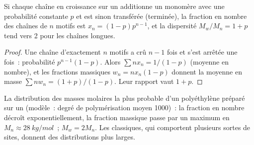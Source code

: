 \begin{proposition}\label{prop:b3:homogeneous-catalysis:schulz-flory}
Si chaque chaîne en croissance sur un  additionne
un monomère avec une probabilité constante $p$ et est sinon transférée
(terminée), la fraction en nombre des chaînes de $n$ motifs est $x_n = (1 - p)p^{n-1}$, et la dispersité $M_w/M_n = 1 + p$ tend vers 2 pour les chaînes longues.
\end{proposition}

\begin{proof}
Une chaîne d'exactement $n$ motifs a crû $n - 1$ fois et s'est arrêtée une
fois~: probabilité $p^{n-1}(1 - p)$. Alors $\sum nx_n = 1/(1 - p)$ (moyenne en nombre), et les fractions
massiques $w_n = nx_n(1 - p)$ donnent la moyenne en masse $\sum nw_n = (1 + p)/(1 - p)$. Leur
rapport vaut $1 + p$.
\end{proof}

\begin{omfigure}

{\small La distribution des masses molaires la plus probable d'un
polyéthylène préparé sur un  (modèle~: degré de
polymérisation moyen 1000)~: la fraction en nombre décroît
exponentiellement, la fraction massique passe par un maximum en $M_n \approx \qty{28}{kg/mol}$~; $M_w = 2M_n$. Les
 classiques, qui comportent plusieurs sortes de
sites, donnent des distributions plus larges.}
\end{omfigure}

